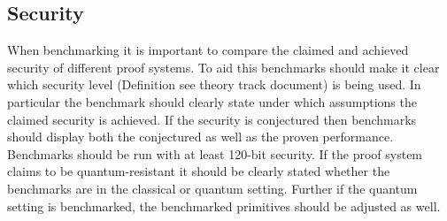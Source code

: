 \subsection{Security}
When benchmarking it is important to compare the claimed and achieved security of different proof systems. To aid this benchmarks should make it clear which security level (Definition see theory track document) is being used. 
In particular the benchmark should clearly state under which assumptions the claimed security is achieved. 
If the security is conjectured then benchmarks should display both the conjectured as well as the proven performance. 
Benchmarks should be run with at least 120-bit security. 
If the proof system claims to be quantum-resistant it should be clearly stated whether the benchmarks are in the classical or quantum setting. 
Further if the quantum setting is benchmarked, the benchmarked primitives should be adjusted as well.
